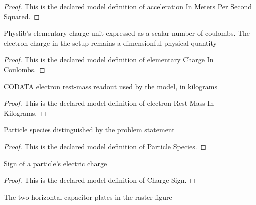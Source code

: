 \begin{proof}
  This is the declared model definition of acceleration In Meters Per Second Squared.
\end{proof}
\begin{definition}
  \label{def:physics:phyx-mini-0836:phyxminiproblems-problemphyxmini0836-elementarychargeincoulombs}
  Physlib's elementary-charge unit expressed as a scalar number of coulombs. The electron charge in the setup remains a dimensionful physical quantity
\end{definition}
\begin{proof}
  This is the declared model definition of elementary Charge In Coulombs.
\end{proof}
\begin{definition}
  \label{def:physics:phyx-mini-0836:phyxminiproblems-problemphyxmini0836-electronrestmassinkilograms}
  CODATA electron rest-mass readout used by the model, in kilograms
\end{definition}
\begin{proof}
  This is the declared model definition of electron Rest Mass In Kilograms.
\end{proof}
\begin{definition}
  \label{def:physics:phyx-mini-0836:phyxminiproblems-problemphyxmini0836-particlespecies}
  Particle species distinguished by the problem statement
\end{definition}
\begin{proof}
  This is the declared model definition of Particle Species.
\end{proof}
\begin{definition}
  \label{def:physics:phyx-mini-0836:phyxminiproblems-problemphyxmini0836-chargesign}
  Sign of a particle's electric charge
\end{definition}
\begin{proof}
  This is the declared model definition of Charge Sign.
\end{proof}
\begin{definition}
  \label{def:physics:phyx-mini-0836:phyxminiproblems-problemphyxmini0836-platelabel}
  The two horizontal capacitor plates in the raster figure
\end{definition}
